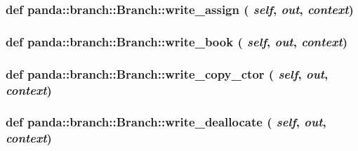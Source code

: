 \label{classpanda_1_1branch_1_1Branch_aa95fcc11b08357eb8bdc4b649c15ca9c}
\hypertarget{classpanda_1_1branch_1_1Branch_a4309415b4e0c852107dd53227864c6c0}{
\subsubsection[{write\_\-assign}]{\setlength{\rightskip}{0pt plus 5cm}def panda::branch::Branch::write\_\-assign ( {\em self}, \/   {\em out}, \/   {\em context})}}
\label{classpanda_1_1branch_1_1Branch_a4309415b4e0c852107dd53227864c6c0}
\hypertarget{classpanda_1_1branch_1_1Branch_a120d981b4287966d51cf650eea6d8b5e}{
\subsubsection[{write\_\-book}]{\setlength{\rightskip}{0pt plus 5cm}def panda::branch::Branch::write\_\-book ( {\em self}, \/   {\em out}, \/   {\em context})}}
\label{classpanda_1_1branch_1_1Branch_a120d981b4287966d51cf650eea6d8b5e}
\hypertarget{classpanda_1_1branch_1_1Branch_a7ef868a4f1a6163051308e3f4353f48f}{
\subsubsection[{write\_\-copy\_\-ctor}]{\setlength{\rightskip}{0pt plus 5cm}def panda::branch::Branch::write\_\-copy\_\-ctor ( {\em self}, \/   {\em out}, \/   {\em context})}}
\label{classpanda_1_1branch_1_1Branch_a7ef868a4f1a6163051308e3f4353f48f}
\hypertarget{classpanda_1_1branch_1_1Branch_a4c286519caece422014891fdc5135c34}{
\subsubsection[{write\_\-deallocate}]{\setlength{\rightskip}{0pt plus 5cm}def panda::branch::Branch::write\_\-deallocate ( {\em self}, \/   {\em out}, \/   {\em context})}}
